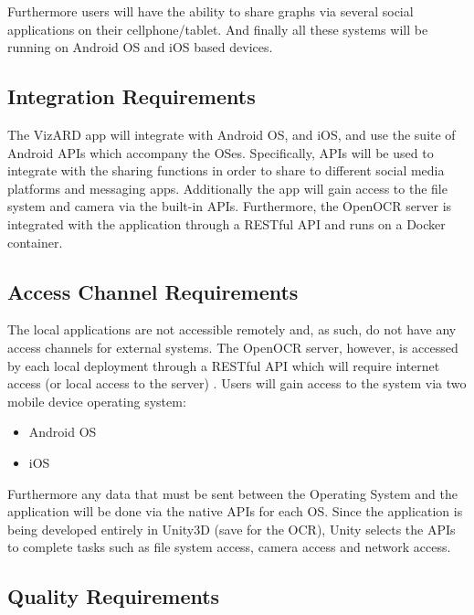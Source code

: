 \documentclass[a4paper,12pt]{article}
\begin{document}
Furthermore users will have the ability to share graphs via several social applications on their cellphone/tablet.
And finally all these systems will be running on Android OS and iOS based devices.

\subsection{Integration Requirements}
The VizARD app will integrate with Android OS, and iOS, and use the suite of Android APIs which accompany the OSes. Specifically, APIs will be used to integrate with the sharing functions in order to share to different social media platforms and messaging apps. Additionally the app will gain access to the file system and camera via the built-in APIs. Furthermore, the OpenOCR server is integrated with the application through a RESTful API and runs on a Docker container.

\subsection{Access Channel Requirements}
The local applications are not accessible remotely and, as such, do not have any access channels for external systems. The OpenOCR server, however, is accessed by each local deployment through a RESTful API which will require internet access (or local access to the server)
.
Users will gain access to the system via two mobile device operating system:
\begin{itemize}
	\item Android OS
	\item iOS
\end{itemize}

Furthermore any data that must be sent between the Operating System and the application will be done via the native APIs for each OS. Since the application is being developed entirely in Unity3D (save for the OCR), Unity selects the APIs to complete tasks such as file system access, camera access and network access.
\subsection{Quality Requirements}
\end{document}

